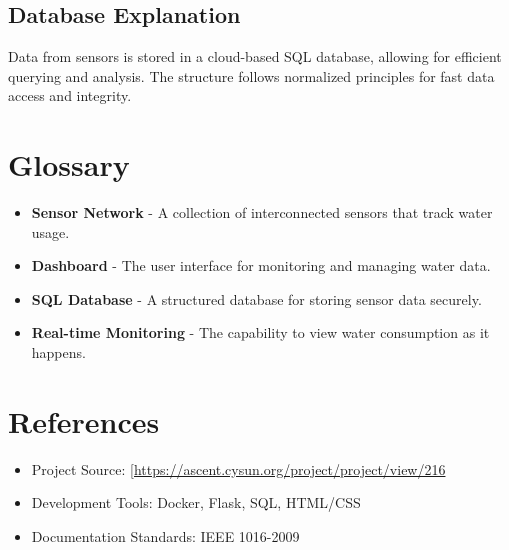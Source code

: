 \documentclass{article}
\begin{document}
\subsection{Database Explanation}
Data from sensors is stored in a cloud-based SQL database, allowing for efficient querying and analysis. The structure follows normalized principles for fast data access and integrity.

\section{Glossary}
\begin{itemize}
\item \textbf{Sensor Network} - A collection of interconnected sensors that track water usage.
\item \textbf{Dashboard} - The user interface for monitoring and managing water data.
\item \textbf{SQL Database} - A structured database for storing sensor data securely.
\item \textbf{Real-time Monitoring} - The capability to view water consumption as it happens.
\end{itemize}

\section{References}
\begin{itemize}
\item Project Source: \url{[https://ascent.cysun.org/project/project/view/216}
\item Development Tools: Docker, Flask, SQL, HTML/CSS
\item Documentation Standards: IEEE 1016-2009
\end{itemize}
\end{document}
